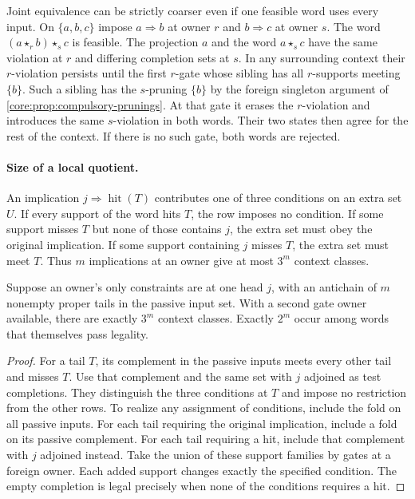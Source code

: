 Joint equivalence can be strictly coarser even if one feasible word
uses every input. On $\{a,b,c\}$ impose $a\Rightarrow b$ at owner
$r$ and $b\Rightarrow c$ at owner $s$. The word
$(a\star_r b)\star_s c$ is feasible. The projection $a$ and the word
$a\star_s c$ have the same violation at $r$ and differing completion
sets at $s$. In any surrounding context their $r$-violation persists
until the first $r$-gate whose sibling has all $r$-supports meeting
$\{b\}$. Such a sibling has the $s$-pruning $\{b\}$ by the foreign
singleton argument of \cref{core:prop:compulsory-prunings}.
At that gate it erases the $r$-violation and introduces the same
$s$-violation in both words. Their two states then agree for the
rest of the context. If there is no such gate, both words are rejected.

\paragraph{Size of a local quotient.}
An implication $j\Rightarrow\operatorname{hit}(T)$ contributes
one of three conditions on an extra set $U$. If every support of the
word hits $T$, the row imposes no condition. If some support misses
$T$ but none of those contains $j$, the extra set must obey the
original implication. If some support containing $j$ misses $T$,
the extra set must meet $T$. Thus $m$ implications at an owner give
at most $3^m$ context classes.

\begin{proposition}
\label{core:prop:pruning-context-index}
Suppose an owner's only constraints are at one head $j$, with an
antichain of $m$ nonempty proper tails in the passive input set.
With a second gate owner available, there are exactly $3^m$
context classes. Exactly $2^m$ occur among words that themselves
pass legality.
\end{proposition}
\begin{proof}
For a tail $T$, its complement in the passive inputs meets every
other tail and misses $T$. Use that complement and the same set
with $j$ adjoined as test completions. They distinguish the three
conditions at $T$ and impose no restriction from the other rows.
To realize any assignment of conditions, include the fold on all
passive inputs. For each tail requiring the original implication,
include a fold on its passive complement. For each tail requiring
a hit, include that complement with $j$ adjoined instead. Take
the union of these support families by gates at a foreign owner.
Each added support changes exactly the specified condition. The
empty completion is legal precisely when none of the conditions
requires a hit.
\end{proof}

